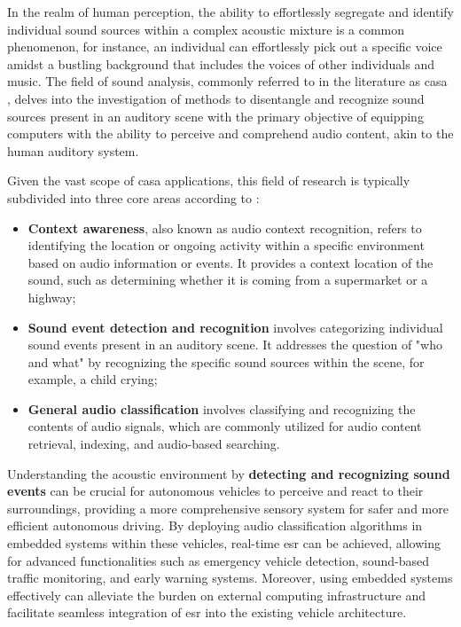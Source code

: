 In the realm of human perception, the ability to effortlessly segregate and identify individual sound sources within a complex acoustic mixture is a common phenomenon, for instance, an individual can effortlessly pick out a specific voice amidst a bustling background that includes the voices of other individuals and music. The field of sound analysis, commonly referred to in the literature as \gls{casa} \cite{Hermes2023}, delves into the investigation of methods to disentangle and recognize sound sources present in an auditory scene with the primary objective of equipping computers with the ability to perceive and comprehend audio content, akin to the human auditory system. 

Given the vast scope of \gls{casa} applications, this field of research is typically subdivided into three core areas according to \textcite{Wang2006}:

\begin{itemize}
    \item \textbf{Context awareness}, also known as audio context recognition, refers to identifying the location or ongoing activity within a specific environment based on audio information or events. It provides a context location of the sound, such as determining whether it is coming from a supermarket or a highway;
    \item \textbf{Sound event detection and recognition} involves categorizing individual sound events present in an auditory scene. It addresses the question of "who and what" by recognizing the specific sound sources within the scene, for example, a child crying;
    \item \textbf{General audio classification} involves classifying and recognizing the contents of audio signals, which are commonly utilized for audio content retrieval, indexing, and audio-based searching.  
\end{itemize}

Understanding the acoustic environment by \textbf{detecting and recognizing sound events} can be crucial for autonomous vehicles to perceive and react to their surroundings, providing a more comprehensive sensory system for safer and more efficient autonomous driving. By deploying audio classification algorithms in embedded systems within these vehicles, real-time \gls{esr} can be achieved, allowing for advanced functionalities such as emergency vehicle detection, sound-based traffic monitoring, and early warning systems. Moreover, using embedded systems effectively can alleviate the burden on external computing infrastructure and facilitate seamless integration of \gls{esr} into the existing vehicle architecture.


